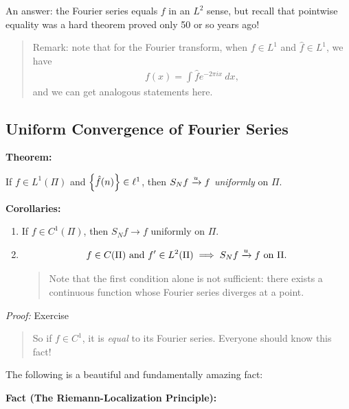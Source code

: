 An answer: the Fourier series equals \(f\) in an \(L^2\) sense, but
recall that pointwise equality was a hard theorem proved only 50 or so
years ago!

\begin{quote}
Remark: note that for the Fourier transform, when \(f\in L^1\) and
\(\hat{f} \in L^1\), we have
\begin{align*}
f(x) = \int \hat{f} e^{-2\pi i x}~dx
,\end{align*} and we can get analogous statements here.
\end{quote}

\hypertarget{uniform-convergence-of-fourier-series}{%
\subsection{Uniform Convergence of Fourier
Series}\label{uniform-convergence-of-fourier-series}}

\textbf{Theorem:}

If \(f\in L^1(\Pi)\) and \(\left\{{\hat{f}(n)}\right\} \in \ell^1\), then
\(S_Nf \xrightarrow{u} f\) \emph{uniformly} on \(\Pi\).

\textbf{Corollaries:}

\begin{enumerate}
\def\labelenumi{\arabic{enumi}.}
\item
  If \(f\in C^1(\Pi)\), then \(S_N f \to f\) uniformly on \(\Pi\).
\item

  \begin{align*}
  f\in C(\Pi) \text{ and } f' \in L^2(\Pi) \implies S_Nf \xrightarrow{u} f \text{ on } \Pi.
  \end{align*}

  \begin{quote}
  Note that the first condition alone is not sufficient: there exists a
  continuous function whose Fourier series diverges at a point.
  \end{quote}
\end{enumerate}

\emph{Proof:} Exercise

\begin{quote}
So if \(f\in C^1\), it is \emph{equal} to its Fourier series. Everyone
should know this fact!
\end{quote}

The following is a beautiful and fundamentally amazing fact:

\textbf{Fact (The Riemann-Localization Principle):}

